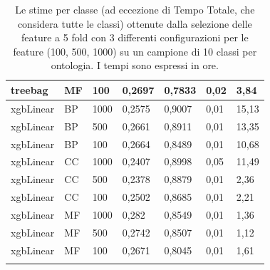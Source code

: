 \documentclass[12pt]{report}
\begin{document}
\begin{appendices}
\begin{longtable}[h]{|l|l|l|l|l|l|l|}
treebag      & MF   & 100     & 0,2697 & 0,7833 & 0,02            & 3,84        \\ \hline
xgbLinear    & BP   & 1000    & 0,2575 & 0,9007 & 0,01            & 15,13       \\ \hline
xgbLinear    & BP   & 500     & 0,2661 & 0,8911 & 0,01            & 13,35       \\ \hline
xgbLinear    & BP   & 100     & 0,2664 & 0,8489 & 0,01            & 10,68       \\ \hline
xgbLinear    & CC   & 1000    & 0,2407 & 0,8998 & 0,05            & 11,49       \\ \hline
xgbLinear    & CC   & 500     & 0,2378 & 0,8879 & 0,01            & 2,36        \\ \hline
xgbLinear    & CC   & 100     & 0,2502 & 0,8685 & 0,01            & 2,21        \\ \hline
xgbLinear    & MF   & 1000    & 0,282  & 0,8549 & 0,01            & 1,36        \\ \hline
xgbLinear    & MF   & 500     & 0,2742 & 0,8507 & 0,01            & 1,12        \\ \hline
xgbLinear    & MF   & 100     & 0,2671 & 0,8045 & 0,01            & 1,61        \\ \hline
\caption{Le stime per classe (ad eccezione di Tempo Totale, che considera tutte le classi) ottenute dalla selezione delle feature a 5 fold con 3 differenti configurazioni per le feature (100, 500, 1000) su un campione di 10 classi per ontologia. I tempi sono espressi in ore.}
\label{featureSelection}
\end{longtable}


\end{appendices}
\end{document}
